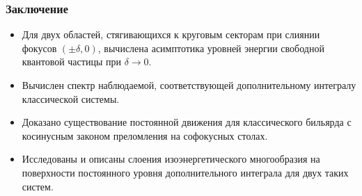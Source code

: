 %

\begin{frame}
    \frametitle{Заключение}
\begin{itemize}
\item Для двух областей, стягивающихся к круговым секторам при слиянии фокусов $(\pm \delta, 0)$, вычислена  асимптотика уровней энергии свободной квантовой частицы при $\delta \to 0$.
\item Вычислен спектр наблюдаемой, соответствующей дополнительному интегралу классической системы.
\item Доказано существование постоянной движения для классического бильярда с косинусным законом преломления на софокусных столах.
\item Исследованы и описаны слоения изоэнергетического многообразия на поверхности постоянного уровня дополнительного интеграла для двух таких систем.
\end{itemize}
\end{frame}

